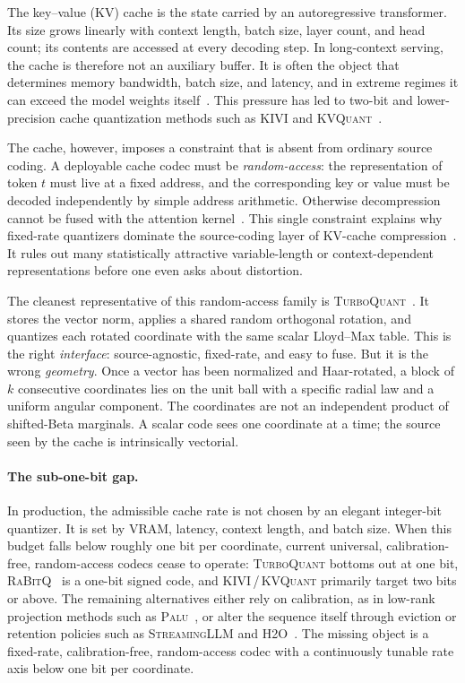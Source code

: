 \documentclass{article}
\theoremstyle{definition}
\theoremstyle{remark}
\begin{document}
The key--value (KV) cache is the state carried by an autoregressive
transformer.  Its size grows linearly with context length, batch
size, layer count, and head count; its contents are accessed at
every decoding step.  In long-context serving, the cache is therefore
not an auxiliary buffer.  It is often the object that determines
memory bandwidth, batch size, and latency, and in extreme regimes it
can exceed the model weights itself~\citep{jiang2025kvcomp}.  This
pressure has led to two-bit and lower-precision cache quantization
methods such as \textsc{KIVI} and
\textsc{KVQuant}~\citep{liu2024kivi, hooper2024kvquant}.

The cache, however, imposes a constraint that is absent from
ordinary source coding.  A deployable cache codec must be
\emph{random-access}: the representation of token $t$ must live at
a fixed address, and the corresponding key or value must be decoded
independently by simple address arithmetic.  Otherwise decompression
cannot be fused with the attention kernel~\citep{jiang2025kvcomp}.
This single constraint explains why fixed-rate quantizers dominate
the source-coding layer of KV-cache
compression~\citep{liu2024kivi, hooper2024kvquant,
zandieh2025turboquant, gao2024rabitq}.  It rules out many
statistically attractive variable-length or context-dependent
representations before one even asks about distortion.

The cleanest representative of this random-access family is
\textsc{TurboQuant}~\citep{zandieh2025turboquant}.  It stores the
vector norm, applies a shared random orthogonal rotation, and
quantizes each rotated coordinate with the same scalar Lloyd--Max
table.  This is the right \emph{interface}: source-agnostic,
fixed-rate, and easy to fuse.  But it is the wrong \emph{geometry}.
Once a vector has been normalized and Haar-rotated, a block of $k$
consecutive coordinates lies on the unit ball with a specific radial
law and a uniform angular component.  The coordinates are not an
independent product of shifted-Beta marginals.  A scalar code sees
one coordinate at a time; the source seen by the cache is
intrinsically vectorial.

\paragraph{The sub-one-bit gap.}
In production, the admissible cache rate is not chosen by an elegant
integer-bit quantizer.  It is set by VRAM, latency, context length,
and batch size.  When this budget falls below roughly one bit per
coordinate, current universal, calibration-free, random-access
codecs cease to operate: \textsc{TurboQuant} bottoms out at one bit,
\textsc{RaBitQ}~\citep{gao2024rabitq} is a one-bit signed code, and
\textsc{KIVI}\,/\,\textsc{KVQuant} primarily target two bits or
above.  The remaining alternatives either rely on calibration, as in
low-rank projection methods such as \textsc{Palu}~\citep{chang2024palu},
or alter the sequence itself through eviction or retention policies
such as \textsc{StreamingLLM} and
\textsc{H2O}~\citep{xiao2024streamingllm, zhang2023h2o}.  The
missing object is a fixed-rate, calibration-free, random-access
codec with a continuously tunable rate axis below one bit per
coordinate.
\end{document}
